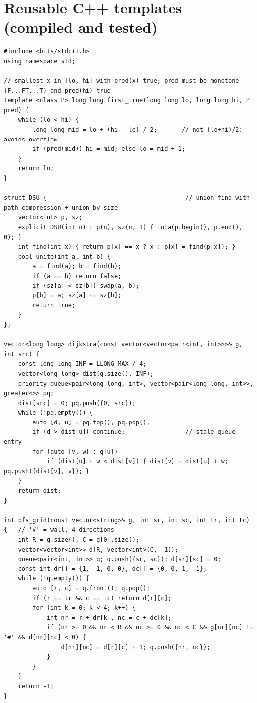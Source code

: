 \documentclass[10pt,a4paper,openany,oneside]{report}
\newcommand{\prio}[1]{\texorpdfstring{\ifcase#1\or{\color{gold}\ding{72}}\or{\color{gold}\ding{72}\ding{72}}\or{\color{gold}\ding{72}\ding{72}\ding{72}}\fi}{}}
\begin{document}
\section{Reusable C++ templates (compiled and tested) \prio{3}}
\begin{lstlisting}[language={[11]C++},title={Binary search on the answer, DSU, Dijkstra, grid BFS}]
#include <bits/stdc++.h>
using namespace std;

// smallest x in [lo, hi] with pred(x) true; pred must be monotone (F...FT...T) and pred(hi) true
template <class P> long long first_true(long long lo, long long hi, P pred) {
    while (lo < hi) {
        long long mid = lo + (hi - lo) / 2;       // not (lo+hi)/2: avoids overflow
        if (pred(mid)) hi = mid; else lo = mid + 1;
    }
    return lo;
}

struct DSU {                                       // union-find with path compression + union by size
    vector<int> p, sz;
    explicit DSU(int n) : p(n), sz(n, 1) { iota(p.begin(), p.end(), 0); }
    int find(int x) { return p[x] == x ? x : p[x] = find(p[x]); }
    bool unite(int a, int b) {
        a = find(a); b = find(b);
        if (a == b) return false;
        if (sz[a] < sz[b]) swap(a, b);
        p[b] = a; sz[a] += sz[b];
        return true;
    }
};

vector<long long> dijkstra(const vector<vector<pair<int, int>>>& g, int src) {
    const long long INF = LLONG_MAX / 4;
    vector<long long> dist(g.size(), INF);
    priority_queue<pair<long long, int>, vector<pair<long long, int>>, greater<>> pq;
    dist[src] = 0; pq.push({0, src});
    while (!pq.empty()) {
        auto [d, u] = pq.top(); pq.pop();
        if (d > dist[u]) continue;                 // stale queue entry
        for (auto [v, w] : g[u])
            if (dist[u] + w < dist[v]) { dist[v] = dist[u] + w; pq.push({dist[v], v}); }
    }
    return dist;
}

int bfs_grid(const vector<string>& g, int sr, int sc, int tr, int tc) {   // '#' = wall, 4 directions
    int R = g.size(), C = g[0].size();
    vector<vector<int>> d(R, vector<int>(C, -1));
    queue<pair<int, int>> q; q.push({sr, sc}); d[sr][sc] = 0;
    const int dr[] = {1, -1, 0, 0}, dc[] = {0, 0, 1, -1};
    while (!q.empty()) {
        auto [r, c] = q.front(); q.pop();
        if (r == tr && c == tc) return d[r][c];
        for (int k = 0; k < 4; k++) {
            int nr = r + dr[k], nc = c + dc[k];
            if (nr >= 0 && nr < R && nc >= 0 && nc < C && g[nr][nc] != '#' && d[nr][nc] < 0) {
                d[nr][nc] = d[r][c] + 1; q.push({nr, nc});
            }
        }
    }
    return -1;
}


\end{lstlisting}
\end{document}
